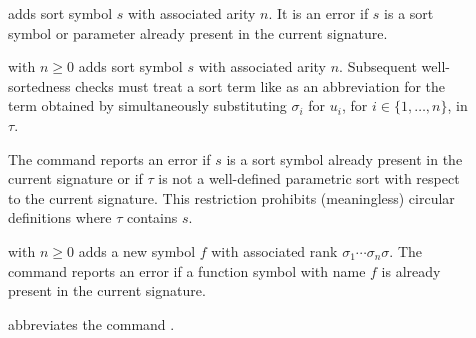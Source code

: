 \begin{description}

%
\item[]
\smallskip

%
\item[]
adds sort symbol $s$ with associated arity $n$.
It is an error if $s$ is a sort symbol or parameter already present 
in the current signature.
\smallskip

%
\item[] with $n \geq 0$
adds sort symbol $s$ with associated arity $n$.
Subsequent well-sortedness checks must treat a sort term like
as an abbreviation for the term obtained by simultaneously substituting
$\sigma_i$ for $u_i$, for $i\in\{1,\ldots,n\}$, in $\tau$.

The command reports an error
if $s$ is a sort symbol already present in the current signature or
if $\tau$ is not a well-defined parametric sort 
with respect to the current signature.
This restriction prohibits (meaningless) circular definitions
where $\tau$ contains $s$.
\smallskip

%
\item[]
with $n \geq 0$ adds a new symbol $f$ 
with associated rank $\sigma_1\cdots\sigma_n\sigma$.
The command reports an error if a function symbol with name $f$ 
is already present in the current signature.
\smallskip

%
\item[]
abbreviates the command .
\smallskip


\end{description}
